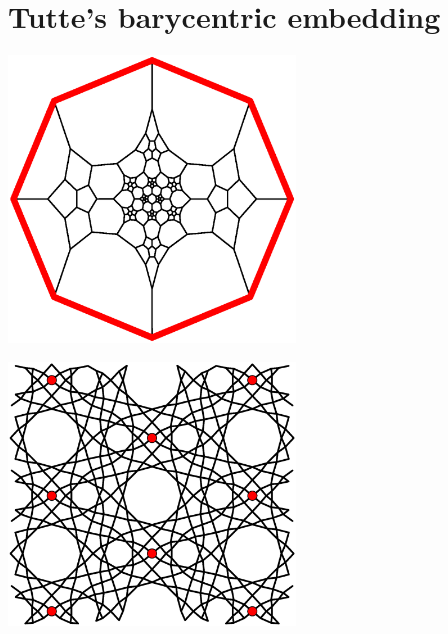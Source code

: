 \documentclass{beamer}
\begin{document}
\section{Tutte's barycentric embedding}

\begin{frame}
  \begin{center}
    \includegraphics[width=3in]{schlegel2}
  \end{center}
\end{frame}

\begin{frame}
  \begin{center}
    \includegraphics[width=3in]{al-equilibrium}
  \end{center}
\end{frame}
\end{document}
